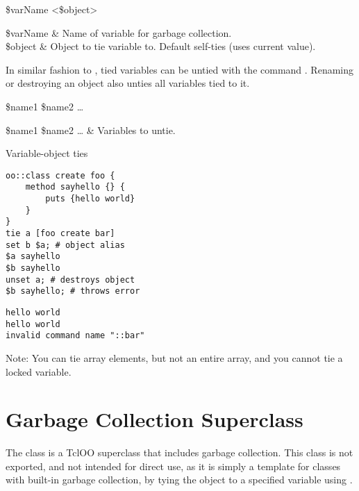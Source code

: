 \documentclass{article}
\begin{document}
\begin{syntax}
 \$varName <\$object>
\end{syntax}
\begin{args}
\$varName & Name of variable for garbage collection. \\
\$object & Object to tie variable to. Default self-ties (uses current value).
\end{args}

In similar fashion to , tied variables can be untied with the command . Renaming or destroying an object also unties all variables tied to it. 
\begin{syntax}
 \$name1 \$name2 …
\end{syntax}
\begin{args}
\$name1 \$name2 … & Variables to untie.
\end{args}

\begin{example}{Variable-object ties}
\begin{lstlisting}
oo::class create foo {
    method sayhello {} {
        puts {hello world}
    }
}
tie a [foo create bar]
set b $a; # object alias
$a sayhello
$b sayhello
unset a; # destroys object
$b sayhello; # throws error
\end{lstlisting}
\tcblower
\begin{lstlisting}
hello world
hello world
invalid command name "::bar"
\end{lstlisting}
\end{example}
Note: You can tie array elements, but not an entire array, and you cannot tie a locked variable.

\clearpage
\section{Garbage Collection Superclass}
The class  is a TclOO superclass that includes garbage collection. 
This class is not exported, and not intended for direct use, as it is simply a template for classes with built-in garbage collection, by tying the object to a specified variable using .
\end{document}
